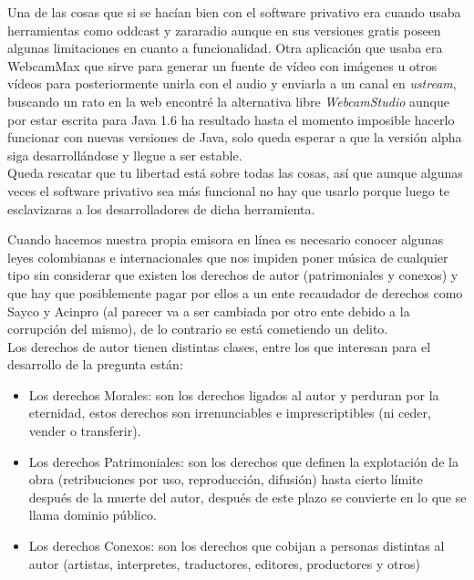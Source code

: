 \begin{multicols}{2}
Una de las cosas que si se hacían bien con el software privativo era cuando usaba herramientas como oddcast y zararadio aunque en sus versiones gratis poseen algunas limitaciones en cuanto a funcionalidad. Otra aplicación que usaba era WebcamMax que sirve para generar un fuente de vídeo con imágenes u otros vídeos para posteriormente unirla con el audio y enviarla a un canal en {\em ustream}, buscando un rato en la web encontré la alternativa libre {\em WebcamStudio} aunque por estar escrita para Java 1.6 ha resultado hasta el momento imposible hacerlo funcionar con nuevas versiones de Java, solo queda esperar a que la versión alpha siga desarrollándose y llegue a ser estable.\\

Queda rescatar que tu libertad está sobre todas las cosas, así que aunque algunas veces el software privativo sea más funcional no hay que usarlo porque luego te esclavizaras a los desarrolladores de dicha herramienta.




Cuando hacemos nuestra propia emisora en línea es necesario conocer algunas leyes colombianas e internacionales que nos impiden poner música de cualquier tipo sin considerar que existen los derechos de autor (patrimoniales y conexos) y que hay que posiblemente pagar por ellos a un ente recaudador de derechos como Sayco y Acinpro (al parecer va a ser cambiada por otro ente debido a la corrupción del mismo), de lo contrario se está cometiendo un delito.\\
Los derechos de autor tienen distintas clases, entre los que interesan para el desarrollo de la pregunta están:
\begin{itemize}
\item Los derechos Morales: son los derechos ligados al autor y perduran por la eternidad, estos derechos son irrenunciables e imprescriptibles (ni ceder, vender o transferir).
\item Los derechos Patrimoniales: son los derechos que definen la explotación de la obra (retribuciones por uso, reproducción, difusión) hasta cierto límite después de la muerte del autor, después de este plazo se convierte en lo que se llama dominio público.
\item Los derechos Conexos: son los derechos que cobijan a personas distintas al autor (artistas, interpretes, traductores, editores, productores y otros)
\end{itemize}


\end{multicols}
